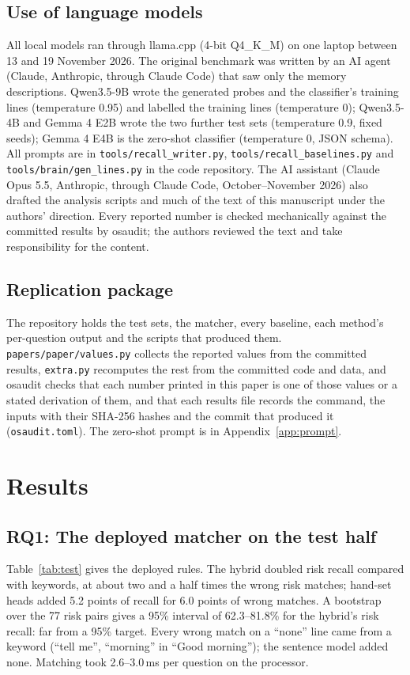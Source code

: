 \documentclass[sn-mathphys-num]{sn-jnl}
\begin{document}
\subsection{Use of language models}
All local models ran through llama.cpp \cite{llamacpp} (4-bit Q4\_K\_M) on one laptop between 13 and 19 November 2026. The original benchmark was written by
an AI agent (Claude, Anthropic, through Claude Code) that saw only the memory descriptions. Qwen3.5-9B \cite{qwen35card} wrote the generated probes and the
classifier's training lines (temperature 0.95) and labelled the training lines (temperature 0); Qwen3.5-4B and Gemma 4 E2B wrote the two
further test sets (temperature 0.9, fixed seeds); Gemma 4 E4B \cite{gemma4card} is the zero-shot classifier (temperature 0, JSON schema). All prompts are in
\texttt{tools/recall\_writer.py}, \texttt{tools/recall\_baselines.py} and \texttt{tools/brain/gen\_lines.py} in the code repository. The AI
assistant (Claude Opus 5.5, Anthropic, through Claude Code, October--November 2026) also drafted the analysis scripts and much of the text of
this manuscript under the authors' direction. Every reported number is checked mechanically against the committed results by osaudit; the authors reviewed the text and
take responsibility for the content.

\subsection{Replication package}
The repository holds the test sets, the matcher, every baseline, each method's per-question output and the scripts that produced them.
\texttt{papers/paper/values.py} collects the reported values from the committed results, \texttt{extra.py} recomputes the rest
from the committed code and data, and osaudit \cite{osaudit} checks that each number printed in this paper is one of those values or a
stated derivation of them, and that each results file records the command, the inputs with their SHA-256 hashes and the commit that
produced it (\texttt{osaudit.toml}). The zero-shot prompt is in Appendix~\ref{app:prompt}.

\section{Results}\label{sec:results}

\subsection{RQ1: The deployed matcher on the test half}
Table~\ref{tab:test} gives the deployed rules. The hybrid doubled risk recall compared with keywords, at about two and a half times the wrong
risk matches; hand-set heads added 5.2 points of recall for 6.0 points of wrong matches. A bootstrap over the 77 risk pairs gives a 95\% interval
of 62.3--81.8\% for the hybrid's risk recall: far from a 95\% target. Every wrong match on a ``none'' line came from a keyword (``tell me'',
``morning'' in ``Good morning''); the sentence model added none. Matching took 2.6--3.0\,ms per question on the processor.
\end{document}
